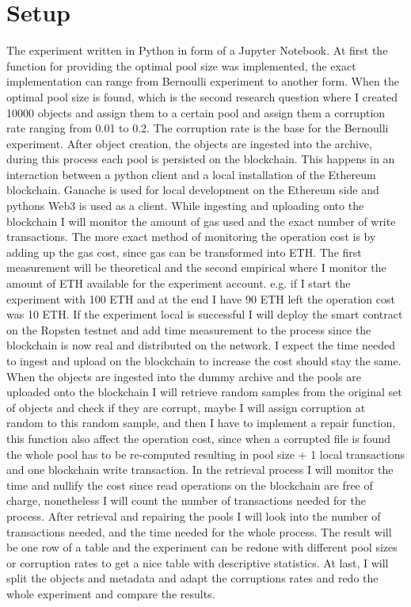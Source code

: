 \section{Setup}
The experiment written in Python in form of a Jupyter Notebook. At first the function for providing the optimal pool size was implemented, the exact implementation can range from Bernoulli experiment to another form. When the optimal pool size is found, which is the second research question where I created 10000 objects and assign them to a certain pool and assign them a corruption rate ranging from 0.01 to 0.2. The corruption rate is the base for the Bernoulli experiment. After object creation, the objects are ingested into the archive, during this process each pool is persisted on the blockchain. This happens in an interaction between a python client and a local installation of the Ethereum blockchain. Ganache is used for local development on the Ethereum side and pythons Web3 is used as a client. While ingesting and uploading onto the blockchain I will monitor the amount of gas used and the exact number of write transactions. The more exact method of monitoring the operation cost is by adding up the gas cost, since gas can be transformed into ETH. The first measurement will be theoretical and the second empirical where I monitor the amount of ETH available for the experiment account. e.g. if I start the experiment with 100 ETH and at the end I have 90 ETH left the operation cost was 10 ETH. If the experiment local is successful I will deploy the smart contract on the Ropsten testnet and add time measurement to the process since the blockchain is now real and distributed on the network. I expect the time needed to ingest and upload on the blockchain to increase the cost should stay the same. When the objects are ingested into the dummy archive and the pools are uploaded onto the blockchain I will retrieve random samples from the original set of objects and check if they are corrupt, maybe I will assign corruption at random to this random sample, and then I have to implement a repair function, this function also affect the operation cost, since when a corrupted file is found the whole pool has to be re-computed resulting in pool size + 1 local transactions and one blockchain write transaction. In the retrieval process I will monitor the time and nullify the cost since read operations on the blockchain are free of charge, nonetheless I will count the number of transactions needed for the process. After retrieval and repairing the pools I will look into the number of transactions needed, and the time needed for the whole process. The result will be one row of a table and the experiment can be redone with different pool sizes or corruption rates to get a nice table with descriptive statistics. 
At last, I will split the objects and metadata and adapt the corruptions rates and redo the whole experiment and compare the results. 
